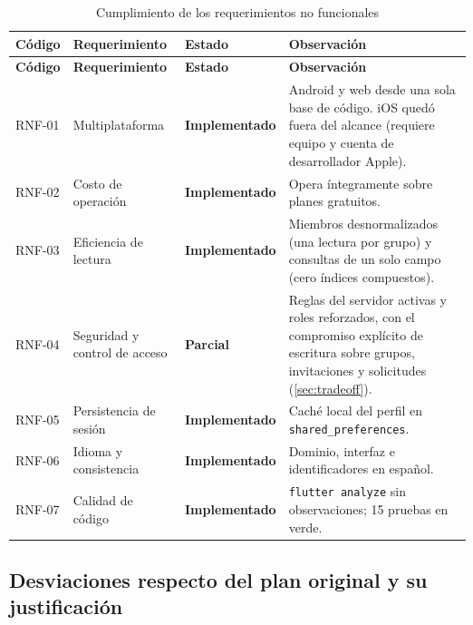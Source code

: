 \documentclass[12pt,a4paper]{article}
\newcommand{\impl}{\textbf{\color{green!45!black}Implementado}}
\newcommand{\parcial}{\textbf{\color{orange!85!black}Parcial}}
\begin{document}
\begin{longtable}{L{1.7cm}L{4.3cm}L{2.7cm}L{4.8cm}}
\caption{Cumplimiento de los requerimientos no funcionales}\label{tab:traza-rnf}\\
\toprule
\textbf{Código} & \textbf{Requerimiento} & \textbf{Estado} & \textbf{Observación} \\
\midrule
\endfirsthead
\toprule
\textbf{Código} & \textbf{Requerimiento} & \textbf{Estado} & \textbf{Observación} \\
\midrule
\endhead
\bottomrule
\endfoot
RNF-01 & Multiplataforma & \impl & Android y web desde una sola base de código. iOS quedó fuera del alcance (requiere equipo y cuenta de desarrollador Apple). \\
RNF-02 & Costo de operación & \impl & Opera íntegramente sobre planes gratuitos. \\
RNF-03 & Eficiencia de lectura & \impl & Miembros desnormalizados (una lectura por grupo) y consultas de un solo campo (cero índices compuestos). \\
RNF-04 & Seguridad y control de acceso & \parcial & Reglas del servidor activas y roles reforzados, con el compromiso explícito de escritura sobre grupos, invitaciones y solicitudes (\ref{sec:tradeoff}). \\
RNF-05 & Persistencia de sesión & \impl & Caché local del perfil en \texttt{shared\_preferences}. \\
RNF-06 & Idioma y consistencia & \impl & Dominio, interfaz e identificadores en español. \\
RNF-07 & Calidad de código & \impl & \texttt{flutter analyze} sin observaciones; 15 pruebas en verde. \\
\end{longtable}

\subsection{Desviaciones respecto del plan original y su justificación}
\label{sec:desviaciones}
\end{document}
